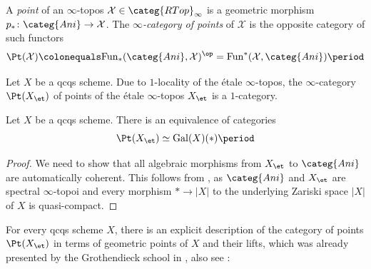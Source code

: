 \documentclass[leqno]{article}
\renewcommand{\Fun}{\mathrm{Fun}}
\renewcommand{\Gal}{\mathrm{Gal}}
\newcommand{\Ani}{\categ{Ani}}
\newcommand{\RTop}{\categ{RTop}}
\renewcommand{\Spec}{\mathrm{Spec}}
\begin{document}
%
\begin{definition}
A \textit{point} of an $\infty$-topos $\mathcal{X}\in \RTop_{\infty}$ is a geometric morphism $p_*\colon \Ani \rightarrow \mathcal{X}$.
The \textit{$\infty$-category of points} of $\mathcal{X}$ is the opposite category of such functors $$\Pt(\mathcal{X})\colonequals \Fun_*(\Ani, \mathcal{X})^{\op}=\Fun^*(\mathcal{X}, \Ani)\period$$
\end{definition}
%
\begin{remark}
Let $X$ be a qcqs scheme. Due to $1$-locality of the \'etale $\infty$-topos, the $\infty$-category $\Pt(X_{\et})$ of points of the \'etale $\infty$-topos $X_{\et}$ is a $1$-category.    
\end{remark}
%
\begin{lemma}
Let $X$ be a qcqs scheme.
There is an equivalence of categories
$$\Pt(X_{\et})\simeq\Gal(X)(*)\period$$
\end{lemma}
\begin{proof}
We need to show that all algebraic morphisms from $X_{\et}$ to $\Ani$ are automatically coherent.
This follows from \cite[Proposition 9.5.7]{Exodromy}, as $\Ani$ and $X_{\et}$ are spectral $\infty$-topoi and every morphism $*\rightarrow |X|$ to the underlying Zariski space $|X|$ of $X$ is quasi-compact.
\end{proof}
%
For every qcqs scheme $X$, there is an explicit description of the category of points $\Pt(X_{\et})$ in terms of geometric points of $X$ and their lifts, which was already presented by the Grothendieck school in \cite[Expos\'e VIII, Th\'eor\`eme 7.9]{SGA4ii}, also see \cite[ Construction 0.0.1., Construction 0.0.2., Construction 12.1.5]{Exodromy}:
%
\end{document}
